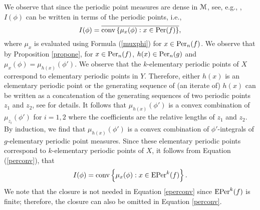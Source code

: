 \documentclass[11pt, reqno]{amsart}
\renewcommand{\refeq}[1]{(\ref{#1})}
\newcommand{\Per}{{\rm Per}}
\newcommand{\EPer}{{\rm EPer}}
\newcommand{\cM}{\EuScript{M}}
\def\Per{{\rm Per}}
\def\Per{{\rm Per}}
\def\EPer{{\rm EPer}}
\begin{document}
We observe that since the periodic point measures are dense in $\cM$, see, e.g., \cite{Par}, $I(\phi)$ can be written in terms of the periodic points, i.e., 
\begin{equation}
I(\phi)=\overline{\conv\left\{\mu_x(\phi): x\in \Per(f)\right\}}\label{perconv},
\end{equation}
where $\mu_x$ is evaluated using Formula (\ref{muxphi}) for $x\in\Per_n(f)$.
We observe that by Proposition \ref{propone}, for $x\in\Per_n(f)$, $h(x)\in \Per_n(g)$ and $\mu_x(\phi)=\mu_{h(x)}(\phi')$.  We observe that the $k$-elementary periodic points of $X$ correspond to elementary periodic points in $Y$.  Therefore, either $h(x)$ is an elementary periodic point or the generating sequence of (an iterate of) $h(x)$ can be written as a concatenation of the generating sequences of two periodic points $z_1$ and $z_2$, see \cite{Je} for details.  It follows that
$
\mu_{h(x)}(\phi')
$
is a convex combination of 
$
\mu_{z_i}(\phi')
$
for $i=1,2$ where the coefficients are the relative lengths of $z_1$ and $z_2$.  By induction, we find that $\mu_{h(x)}(\phi')$ is a convex combination of $\phi'$-integrals of $g$-elementary periodic point measures.  Since these elementary periodic points correspond to $k$-elementary periodic points of $X$, it follows from Equation \refeq{perconv}, that  
\begin{equation}\label{eperconv}
I(\phi)=\conv\left\{\mu_x(\phi): x\in \EPer^k(f)\right\}.
\end{equation}
We note that the closure is not needed in Equation \eqref{eperconv} since $\EPer^k(f)$ is finite; therefore, the closure can also be omitted in Equation \eqref{perconv}.
\end{document}
